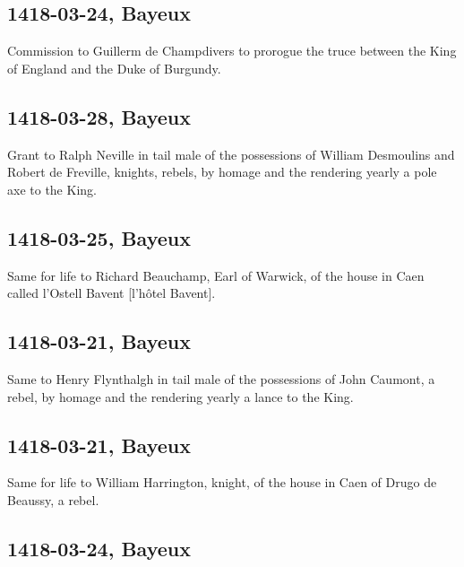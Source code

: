 \documentclass[a4paper,12pt,twoside]{book}
\begin{document}
            \subsection{1418-03-24, Bayeux}
            
                  Commission to Guillerm de Champdivers to prorogue the truce between the King of England and the Duke of Burgundy.
               
            \subsection{1418-03-28, Bayeux}
            
                  Grant to Ralph Neville in tail male of the possessions of William Desmoulins and Robert de Freville, knights, rebels, by homage and the rendering yearly a pole axe to the King.
               
            \subsection{1418-03-25, Bayeux}
            
                  Same for life to Richard Beauchamp, Earl of Warwick, of the house in Caen called l'Ostell Bavent [l’hôtel Bavent].
               
            \subsection{1418-03-21, Bayeux}
            
                  Same to Henry Flynthalgh in tail male of the possessions of John Caumont, a rebel, by homage and the rendering yearly a lance to the King.
               
            \subsection{1418-03-21, Bayeux}
            
                  Same for life to William Harrington, knight, of the house in Caen of Drugo de Beaussy, a rebel.
               
            \subsection{1418-03-24, Bayeux}
            
\end{document}

